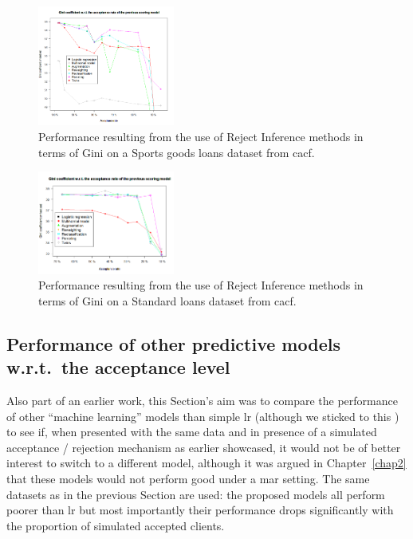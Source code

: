 \begin{figure}[H]
\centering
\includegraphics[width=0.4\textwidth]{figures/appendix/rejectinferencedecathlon.png}
\caption{Performance resulting from the use of Reject Inference methods in terms of Gini on a Sports goods loans dataset from \gls{cacf}.}
\label{fig:decathlon_reject}
\end{figure}

\begin{figure}[H]
\centering
\includegraphics[width=0.4\textwidth]{figures/appendix/rejectinferenceM3.png}
\caption{Performance resulting from the use of Reject Inference methods in terms of Gini on a Standard loans dataset from \gls{cacf}.}
\label{fig:M3_reject}
\end{figure}


\subsection{Performance of other predictive models w.r.t.\ the acceptance level} \label{subsec:app_reject_real_method}

Also part of an earlier work, this Section's aim was to compare the performance of other ``machine learning'' models than simple \gls{lr} (although we sticked to this ) to see if, when presented with the same data and in presence of a simulated acceptance / rejection mechanism as earlier showcased, it would not be of better interest to switch to a different model, although it was argued in Chapter~\ref{chap2} that these models would not perform good under a \gls{mar} setting. The same datasets as in the previous Section are used: the proposed models all perform poorer than \gls{lr} but most importantly their performance drops significantly with the proportion of simulated accepted clients.

